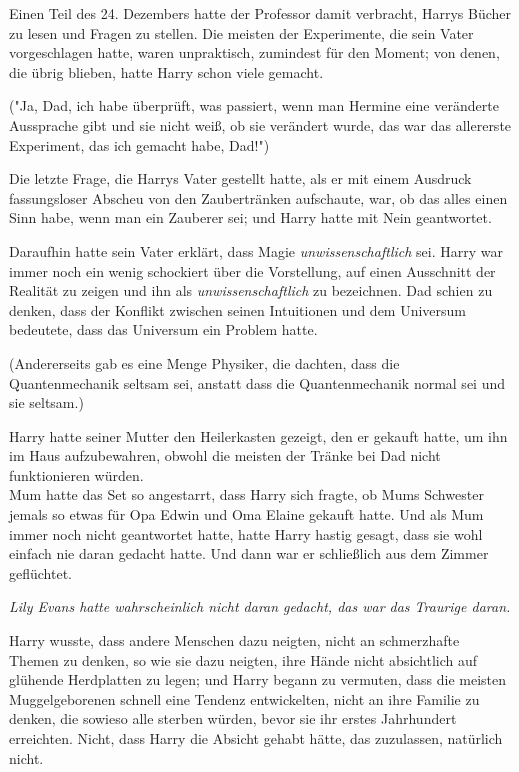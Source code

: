 {Einen Teil des 24. Dezembers hatte der Professor damit verbracht, Harrys Bücher zu lesen und Fragen zu stellen. Die meisten der Experimente, die sein Vater vorgeschlagen hatte, waren unpraktisch, zumindest für den Moment; von denen, die übrig blieben, hatte Harry schon viele gemacht.

("Ja, Dad, ich habe überprüft, was passiert, wenn man Hermine eine veränderte Aussprache gibt und sie nicht weiß, ob sie verändert wurde, das war das allererste Experiment, das ich gemacht habe, Dad!")

Die letzte Frage, die Harrys Vater gestellt hatte, als er mit einem Ausdruck fassungsloser Abscheu von den Zaubertränken aufschaute, war, ob das alles einen Sinn habe, wenn man ein Zauberer sei; und Harry hatte mit Nein geantwortet.

Daraufhin hatte sein Vater erklärt, dass Magie \emph{unwissenschaftlich} sei. Harry war immer noch ein wenig schockiert über die Vorstellung, auf einen Ausschnitt der Realität zu zeigen und ihn als \emph{unwissenschaftlich} zu bezeichnen. Dad schien zu denken, dass der Konflikt zwischen seinen Intuitionen und dem Universum bedeutete, dass das Universum ein Problem hatte.

(Andererseits gab es eine Menge Physiker, die dachten, dass die Quantenmechanik seltsam sei, anstatt dass die Quantenmechanik normal sei und sie seltsam.)

Harry hatte seiner Mutter den Heilerkasten gezeigt, den er gekauft hatte, um ihn im Haus aufzubewahren, obwohl die meisten der Tränke bei Dad nicht funktionieren würden.\\ Mum hatte das Set so angestarrt, dass Harry sich fragte, ob Mums Schwester jemals so etwas für Opa Edwin und Oma Elaine gekauft hatte. Und als Mum immer noch nicht geantwortet hatte, hatte Harry hastig gesagt, dass sie wohl einfach nie daran gedacht hatte. Und dann war er schließlich aus dem Zimmer geflüchtet.

\emph{Lily Evans hatte wahrscheinlich nicht daran gedacht, das war das Traurige daran.}

Harry wusste, dass andere Menschen dazu neigten, nicht an schmerzhafte Themen zu denken, so wie sie dazu neigten, ihre Hände nicht absichtlich auf glühende Herdplatten zu legen; und Harry begann zu vermuten, dass die meisten Muggelgeborenen schnell eine Tendenz entwickelten, nicht an ihre Familie zu denken, die sowieso alle sterben würden, bevor sie ihr erstes Jahrhundert erreichten. Nicht, dass Harry die Absicht gehabt hätte, das zuzulassen, natürlich nicht.

}
